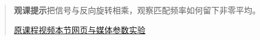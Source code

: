 \begin{quote}\small\textbf{观课提示}\quad 把信号与反向旋转相乘，观察匹配频率如何留下非零平均。

\href{https://www.youtube.com/watch?v=r6sGWTCMz2k}{原课程视频}\quad\href{https://vitael04213.github.io/3blue1brown-notes/lessons/fourier-series.html}{本节网页与媒体}\quad\href{https://vitael04213.github.io/3blue1brown-notes/lab.html\#heat}{参数实验}
\end{quote}
